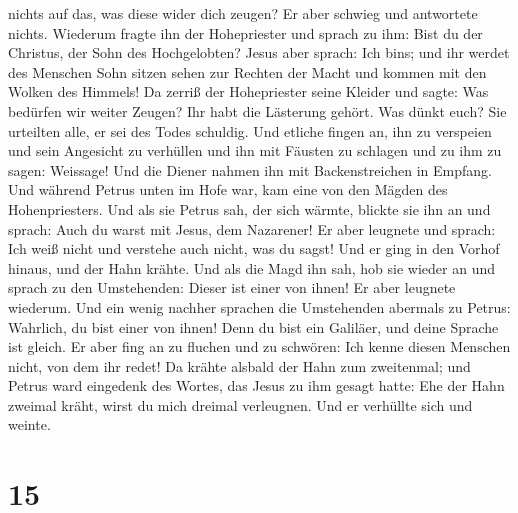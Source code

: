 nichts auf das, was diese wider dich zeugen?  Er aber
schwieg und antwortete nichts. Wiederum fragte ihn der Hohepriester und
sprach zu ihm: Bist du der Christus, der Sohn des Hochgelobten?
 Jesus aber sprach: Ich bin\textquotesingle s; und ihr
werdet des Menschen Sohn sitzen sehen zur Rechten der Macht und kommen
mit den Wolken des Himmels!  Da zerriß der Hohepriester
seine Kleider und sagte: Was bedürfen wir weiter Zeugen? 
Ihr habt die Lästerung gehört. Was dünkt euch? Sie urteilten alle, er
sei des Todes schuldig.  Und etliche fingen an, ihn zu
verspeien und sein Angesicht zu verhüllen und ihn mit Fäusten zu
schlagen und zu ihm zu sagen: Weissage! Und die Diener nahmen ihn mit
Backenstreichen in Empfang.  Und während Petrus unten im
Hofe war, kam eine von den Mägden des Hohenpriesters. 
Und als sie Petrus sah, der sich wärmte, blickte sie ihn an und sprach:
Auch du warst mit Jesus, dem Nazarener!  Er aber leugnete
und sprach: Ich weiß nicht und verstehe auch nicht, was du sagst! Und er
ging in den Vorhof hinaus, und der Hahn krähte.  Und als
die Magd ihn sah, hob sie wieder an und sprach zu den Umstehenden:
Dieser ist einer von ihnen!  Er aber leugnete wiederum.
Und ein wenig nachher sprachen die Umstehenden abermals zu Petrus:
Wahrlich, du bist einer von ihnen! Denn du bist ein Galiläer, und deine
Sprache ist gleich.  Er aber fing an zu fluchen und zu
schwören: Ich kenne diesen Menschen nicht, von dem ihr redet!
 Da krähte alsbald der Hahn zum zweitenmal; und Petrus
ward eingedenk des Wortes, das Jesus zu ihm gesagt hatte: Ehe der Hahn
zweimal kräht, wirst du mich dreimal verleugnen. Und er verhüllte sich
und weinte.

\hypertarget{section-14}{%
\section{15}\label{section-14}}

